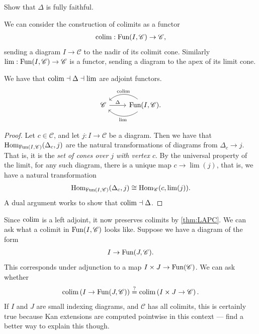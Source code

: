 \begin{exercise}\label{exer:diagonal-functor-into-functor-cat-fully-faithful} Show that $\Delta$ is fully faithful.
\end{exercise}


\begin{remark} We can consider the construction of colimits as a functor
\begin{align*}
    \mathop{\operatorname*{colim}} : \text{Fun}(I, \mathscr{C}) \to \mathscr{C},
\end{align*}
sending a diagram $I \to \mathscr{C}$ to the nadir of its colimit cone. Similarly $\lim: \text{Fun}(I, \mathscr{C}) \to \mathscr{C}$ is a functor, sending a diagram to the apex of its limit cone.
\end{remark}

\begin{proposition} We have that $\mathop{\operatorname*{colim}} \dashv \Delta \dashv \lim$ are adjoint functors.
\[ \begin{tikzcd}
    \mathscr{C}\rar["\Delta"] & \Fun(I,\mathscr{C})\lar[bend right=40,"\colim" above]\lar[bend left=40,"\lim" below].
\end{tikzcd} \]
\end{proposition}
\begin{proof} Let $c\in \mathscr{C}$, and let $j: I \to \mathscr{C}$ be a diagram. Then we have that $\textup{Hom}_{\text{Fun}(I,\mathscr{C})}(\Delta_c, j)$ are the natural transformations of diagrams from $\Delta_c \to j$. That is, it is the \textit{set of cones over $j$ with vertex $c$}. By the universal property of the limit, for any such diagram, there is a unique map $c \to \lim(j)$, that is, we have a natural transformation
\begin{align*}
    \textup{Hom}_{\text{Fun}(I,\mathscr{C})}(\Delta_c, j) \cong \textup{Hom}_\mathscr{C}(c, \lim(j)).
\end{align*}
A dual argument works to show that $\mathop{\operatorname*{colim}} \dashv \Delta$.
\end{proof}

\begin{remark}\label{rmk:colimits-in-functor-categories} Since $\mathop{\operatorname*{colim}}$ is a left adjoint, it now preserves colimits by \autoref{thm:LAPC}. We can ask what a colimit in $\text{Fun}(I,\mathscr{C})$ looks like. Suppose we have a diagram of the form
\begin{align*}
    I \to \text{Fun}(J, \mathscr{C}).
\end{align*}
This corresponds under adjunction to a map $I \times J \to \text{Fun}(\mathscr{C})$. We can ask whether
\begin{align*}
    \mathop{\operatorname*{colim}} \left( I \to \text{Fun}(J, \mathscr{C}) \right) \overset{?}{=} \mathop{\operatorname*{colim}} \left( I \times J \to \mathscr{C} \right).
\end{align*}
If $I$ and $J$ are small indexing diagrams, and $\mathscr{C}$ has all colimits, this is certainly true {\color{blue} because Kan extensions are computed pointwise in this context --- find a better way to explain this though}.
\end{remark}



